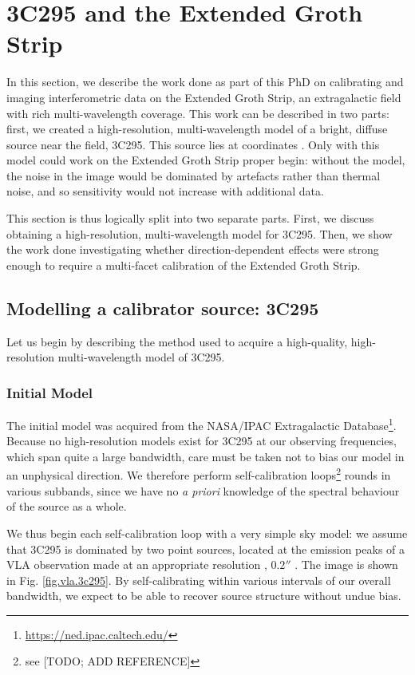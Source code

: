 
\section{3C295 and the Extended Groth Strip}\label{section.3c295+EGS}
\pg
In this section, we describe the work done as part of this PhD on calibrating and imaging interferometric data on the Extended Groth Strip, an extragalactic field with rich multi-wavelength coverage. This work can be described in two parts: first, we created a high-resolution, multi-wavelength model of a bright, diffuse source near the field, 3C295. This source lies at coordinates . Only with this model could work on the Extended Groth Strip proper begin: without the model, the noise in the image would be dominated by artefacts rather than thermal noise, and so sensitivity would not increase with additional data. 

\pg
This section is thus logically split into two separate parts. First, we discuss obtaining a high-resolution, multi-wavelength model for 3C295. Then, we show the work done investigating whether direction-dependent effects were strong enough to require a multi-facet calibration of the Extended Groth Strip.


\subsection{Modelling a calibrator source: 3C295}\label{section.3c295}

\pg
Let us begin by describing the method used to acquire a high-quality, high-resolution multi-wavelength model of 3C295. 

\subsubsection{Initial Model}
\pg
The initial model was acquired from the NASA/IPAC Extragalactic Database\footnote{\hyperref[here]{https://ned.ipac.caltech.edu/}}. Because no high-resolution models exist for 3C295 at our observing frequencies, which span quite a large bandwidth, care must be taken not to bias our model in an unphysical direction. We therefore perform self-calibration loops\footnote{see [TODO; ADD REFERENCE]} rounds in various subbands, since we have no \emph{a priori} knowledge of the spectral behaviour of the source as a whole.

\pg
We thus begin each self-calibration loop with a very simple sky model: we assume that 3C295 is dominated by two point sources, located at the emission peaks of a VLA observation made at an appropriate resolution , $0.2''$ \citep[see][]{1991AJ....101.1623P}. The image is shown in Fig. \ref{fig.vla.3c295}. By self-calibrating within various intervals of our overall bandwidth, we expect to be able to recover source structure without undue bias. 

